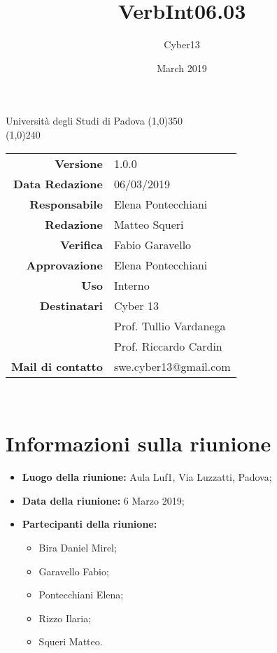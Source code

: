 \documentclass[a4paper, 12pt]{article}
\title{VerbInt06.03}
\author{Cyber13}
\date{March 2019}
\begin{document}
	\begin{titlepage}
		\centering Università degli Studi di Padova
		\line(1,0){350}\\
		\vspace{1.2cm}
		\logo
		\vspace{1.0cm}
		\vspace{0.5cm}
		\vspace{0.5cm}
		\line(1,0){240}\\
		\begin{tabular}{r|l}
			{\textbf{Versione}} 			& 1.0.0\\
			{\textbf{Data Redazione}} 	& 06/03/2019\\	%
			{\textbf{Responsabile}} 	& Elena Pontecchiani\\	%
			{\textbf{Redazione}} 		& Matteo Squeri\\ 
			{\textbf{Verifica}} 			& Fabio Garavello \\ 
			{\textbf{Approvazione}} 		& Elena Pontecchiani\\
			{\textbf{Uso}} 				& Interno\\
			{\textbf{Destinatari}} 	& Cyber 13\\ & Prof. Tullio Vardanega\\ & Prof. Riccardo Cardin\\
			{\textbf{Mail di contatto}} 	& swe.cyber13@gmail.com\\
		\end{tabular}\\
	\end{titlepage}

	\newpage
\newpage
		
	
	\newpage
		\tableofcontents
	    	\newpage
        	\section{Informazioni sulla riunione}
\begin{itemize}
	\item \textbf{Luogo della riunione:} Aula Luf1, Via Luzzatti, Padova;
	\item \textbf{Data della riunione:} 6 Marzo 2019;
	
	\item \textbf{Partecipanti della riunione:}
		\begin{itemize}
		    \item Bira Daniel Mirel;
            \item Garavello Fabio;
            \item Pontecchiani Elena;
			\item Rizzo Ilaria;
			\item Squeri Matteo.
		\end{itemize}
\end{itemize}
\end{document}
